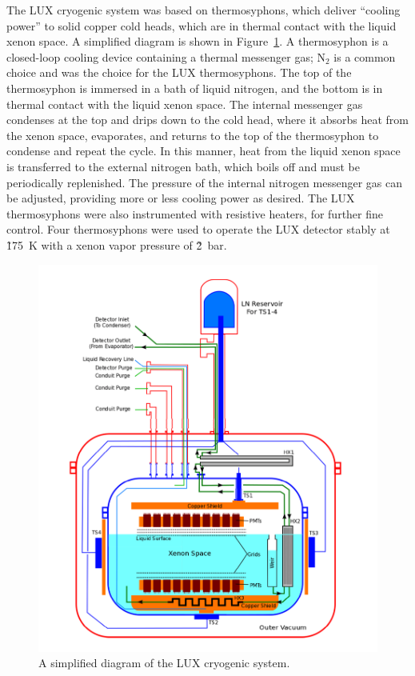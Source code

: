 The \ac{LUX} cryogenic system was based on thermosyphons, which deliver ``cooling power'' to solid copper cold heads, which are in thermal contact with the liquid xenon space. A simplified diagram is shown in Figure~\ref{fig:luxcryo}. A thermosyphon is a closed-loop cooling device containing a thermal messenger gas; N$_{2}$ is a common choice and was the choice for the \ac{LUX} thermosyphons. The top of the thermosyphon is immersed in a bath of liquid nitrogen, and the bottom is in thermal contact with the liquid xenon space. The internal messenger gas condenses at the top and drips down to the cold head, where it absorbs heat from the xenon space, evaporates, and returns to the top of the thermosyphon to condense and repeat the cycle. In this manner, heat from the liquid xenon space is transferred to the external nitrogen bath, which boils off and must be periodically replenished. The pressure of the internal nitrogen messenger gas can be adjusted, providing more or less cooling power as desired. The \ac{LUX} thermosyphons were also instrumented with resistive heaters, for further fine control. Four thermosyphons were used to operate the \ac{LUX} detector stably at \~175~K with a xenon vapor pressure of \~2~bar. 

\begin{figure}[htbp]
\begin{center}
\includegraphics[width=\textwidth]{figures/lux/lux_cryostats.png}
\caption{A simplified diagram of the LUX cryogenic system. \cite{Larsen2016}}
\label{fig:luxcryo}
\end{center}
\end{figure}

